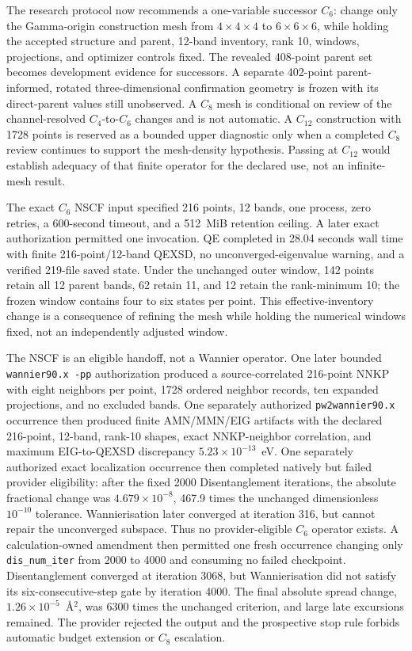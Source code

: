 \documentclass[11pt]{article}
\begin{document}
The research protocol now recommends a one-variable successor $C_6$: change only the
Gamma-origin construction mesh from $4\times4\times4$ to $6\times6\times6$, while
holding the accepted structure and parent, 12-band inventory, rank 10, windows,
projections, and optimizer controls fixed.  The revealed 408-point parent set becomes
development evidence for successors.  A separate 402-point parent-informed, rotated
three-dimensional confirmation geometry is frozen with its direct-parent values still
unobserved.  A $C_8$ mesh is conditional on review of the channel-resolved
$C_4$-to-$C_6$ changes and is not automatic.  A $C_{12}$ construction with 1728 points
is reserved as a bounded upper diagnostic only when a completed $C_8$ review continues
to support the mesh-density hypothesis.  Passing at $C_{12}$ would establish adequacy
of that finite operator for the declared use, not an infinite-mesh result.

The exact $C_6$ NSCF input specified 216 points, 12 bands, one process, zero retries, a
600-second timeout, and a 512~MiB retention ceiling.  A later exact authorization
permitted one invocation.  QE completed in 28.04 seconds wall time with finite
216-point/12-band QEXSD, no unconverged-eigenvalue warning, and a verified 219-file saved
state.  Under the unchanged outer window, 142 points retain all 12 parent bands, 62
retain 11, and 12 retain the rank-minimum 10; the frozen window contains four to six
states per point.  This effective-inventory change is a consequence of refining the
mesh while holding the numerical windows fixed, not an independently adjusted window.

The NSCF is an eligible handoff, not a Wannier operator.  One later bounded
\texttt{wannier90.x -pp} authorization produced a source-correlated 216-point NNKP with
eight neighbors per point, 1728 ordered neighbor records, ten expanded projections, and
no excluded bands.  One separately authorized \texttt{pw2wannier90.x} occurrence then
produced finite AMN/MMN/EIG artifacts with the declared 216-point, 12-band, rank-10
shapes, exact NNKP-neighbor correlation, and maximum EIG-to-QEXSD discrepancy
$5.23\times10^{-13}$~eV.  One separately authorized exact localization occurrence then
completed natively but failed provider eligibility: after the fixed 2000
Disentanglement iterations, the absolute fractional change was $4.679\times10^{-8}$,
467.9 times the unchanged dimensionless $10^{-10}$ tolerance.  Wannierisation later
converged at iteration 316, but cannot repair the unconverged subspace.  Thus no
provider-eligible $C_6$ operator exists.  A calculation-owned amendment then permitted
one fresh occurrence changing only \texttt{dis\_num\_iter} from 2000 to 4000 and
consuming no failed checkpoint.  Disentanglement converged at iteration 3068, but
Wannierisation did not satisfy its six-consecutive-step gate by iteration 4000.  The
final absolute spread change, $1.26\times10^{-5}$~\AA$^2$, was 6300 times the unchanged
criterion, and large late excursions remained.  The provider rejected the output and
the prospective stop rule forbids automatic budget extension or $C_8$ escalation.
\end{document}
